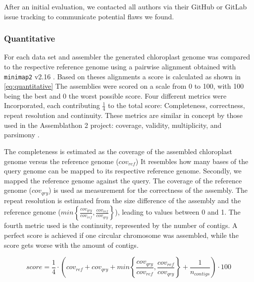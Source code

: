 \documentclass{bmcart}
\begin{document}
After an initial evaluation, we contacted all authors via their GitHub or GitLab issue tracking to communicate potential flaws we found.

\subsubsection*{Quantitative}

%



For each data set and assembler the generated chloroplast genome was compared to the respective reference genome using a pairwise alignment obtained with \texttt{minimap2} v2.16 \cite{li2018minimap2}. Based on theses alignments a score is calculated as shown in \cref{eq:quantitative}
The assemblies were scored on a scale from 0 to 100, with 100 being the best and 0 the worst possible score. Four different metrics were Incorporated, each contributing  $\frac{1}{4}$ to the total score: Completeness, correctness, repeat resolution and continuity.
These metrics are similar in concept by those used in the Assemblathon 2 project: coverage, validity, multiplicity, and parsimony \cite{assemblathon2}.

The completeness is estimated as the coverage of the assembled chloroplast genome versus the reference genome ($cov_{ref}$)
It resembles how many bases of the query genome can be mapped to its respective reference genome.
Secondly, we mapped the reference genome against the query.
The coverage of the reference genome ($cov_{qry}$) is used as measurement for the correctness of the assembly.
The repeat resolution is estimated from the size difference of the assembly and the reference genome ($min\left\{ \frac{cov_{qry}}{cov_{ref}}, \frac{cov_{ref}}{cov_{qry}}\right\}$), leading to values between 0 and 1.
The fourth metric used is the continuity, represented by the number of contigs.
A perfect score is achieved if one circular chromosome was assembled, while the score gets worse with the amount of contigs.

\begin{equation}
   score = \frac{1}{4} \cdot \left( cov_{ref} +  cov_{qry} + min\left\{ \frac{cov_{qry}}{cov_{ref}}, \frac{cov_{ref}}{cov_{qry}}\right\} + \frac{1}{n_{contigs} }\right) \cdot 100 
   \label{eq:quantitative}
\end{equation}
\end{document}

